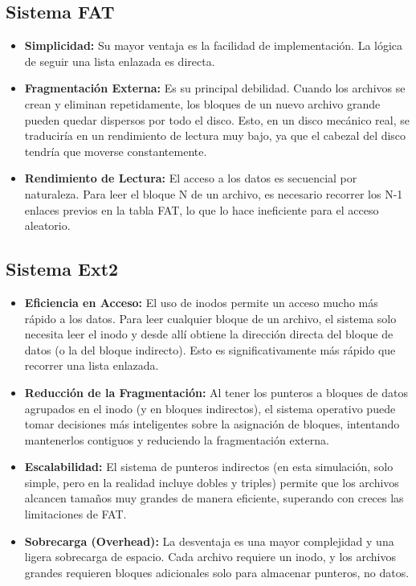 \documentclass[12pt, a4paper]{article}
\begin{document}
\begin{itemize}
\subsection{Sistema FAT}
\begin{itemize}
    \item \textbf{Simplicidad:} Su mayor ventaja es la facilidad de implementación. La lógica de seguir una lista enlazada es directa.
    \item \textbf{Fragmentación Externa:} Es su principal debilidad. Cuando los archivos se crean y eliminan repetidamente, los bloques de un nuevo archivo grande pueden quedar dispersos por todo el disco. Esto, en un disco mecánico real, se traduciría en un rendimiento de lectura muy bajo, ya que el cabezal del disco tendría que moverse constantemente.
    \item \textbf{Rendimiento de Lectura:} El acceso a los datos es secuencial por naturaleza. Para leer el bloque N de un archivo, es necesario recorrer los N-1 enlaces previos en la tabla FAT, lo que lo hace ineficiente para el acceso aleatorio.
\end{itemize}

\subsection{Sistema Ext2}
\begin{itemize}
    \item \textbf{Eficiencia en Acceso:} El uso de inodos permite un acceso mucho más rápido a los datos. Para leer cualquier bloque de un archivo, el sistema solo necesita leer el inodo y desde allí obtiene la dirección directa del bloque de datos (o la del bloque indirecto). Esto es significativamente más rápido que recorrer una lista enlazada.
    \item \textbf{Reducción de la Fragmentación:} Al tener los punteros a bloques de datos agrupados en el inodo (y en bloques indirectos), el sistema operativo puede tomar decisiones más inteligentes sobre la asignación de bloques, intentando mantenerlos contiguos y reduciendo la fragmentación externa.
    \item \textbf{Escalabilidad:} El sistema de punteros indirectos (en esta simulación, solo simple, pero en la realidad incluye dobles y triples) permite que los archivos alcancen tamaños muy grandes de manera eficiente, superando con creces las limitaciones de FAT.
    \item \textbf{Sobrecarga (Overhead):} La desventaja es una mayor complejidad y una ligera sobrecarga de espacio. Cada archivo requiere un inodo, y los archivos grandes requieren bloques adicionales solo para almacenar punteros, no datos.
\end{itemize}


\end{itemize}
\end{document}
